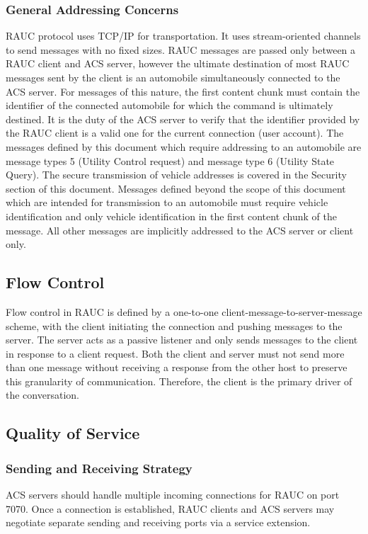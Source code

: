 \subsubsection{General Addressing Concerns}
\textsf{RAUC} protocol uses TCP/IP for transportation. It uses stream-oriented channels to send messages with no fixed sizes. RAUC messages are passed only between a RAUC client and ACS server, however the ultimate destination of most RAUC messages sent by the client is an automobile simultaneously connected to the ACS server. For messages of this nature, the  first content chunk must contain the identifier of the connected automobile for which the command is ultimately destined. It is the duty of the ACS server to verify that the identifier provided by the RAUC client is a valid one for the current connection (user account).  The messages defined by this document which require addressing to an automobile are message types 5 (Utility Control request) and message type 6 (Utility State Query). The secure transmission of vehicle addresses is covered in the Security section of this document. Messages defined beyond the scope of this document which are intended for transmission to an automobile must require vehicle identification and only vehicle identification in the first content chunk of the message. All other messages are implicitly addressed to the ACS server or client only.  



\label{sec:ct}

\subsection{Flow Control}
\label{sec:pdus:flow}
Flow control in RAUC is defined by a one-to-one client-message-to-server-message scheme, with the client initiating the connection and pushing messages to the server. The server acts as a passive listener and only sends messages to the client in response to a client request. Both the client and server must not send more than one message without receiving a response from the other host to preserve this granularity of communication. Therefore, the client is the primary driver of the conversation.

\subsection{Quality of Service}
\subsubsection{Sending and Receiving Strategy}
ACS servers should handle multiple incoming connections for RAUC on port 7070. Once a connection is established, RAUC clients and ACS servers may negotiate separate sending and receiving ports via a service extension.

